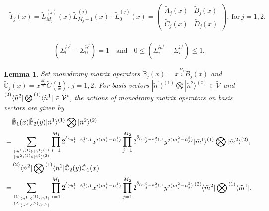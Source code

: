 \documentclass[10pt,a4paper]{amsart}
\newtheorem{lemma}{Lemma}
\begin{document}
	\begin{align}\label{T-j}
		\begin{aligned}
			\tilde{T}_{j}(x) =\tilde{L}_{M_{j}}^{(j)}(x)\tilde{L}_{M_{j}-1}^{(j)}(x)\cdots \tilde{L}_{0}^{(j)}(x)
			=
			\begin{pmatrix}
				\tilde{A}_j(x) & \tilde{B}_j(x) \\
				\tilde{C}_j(x) & \tilde{D}_j(x)
			\end{pmatrix}, \mathrm{~for~} j=1,2.
		\end{aligned}
	\end{align}

	\begin{align}\label{xrxtj}
		(\Sigma_0^{\tilde{m}^j} - \Sigma_0^{\tilde{n}^j}) = 1\quad \text{and} \quad 0 \leq (\Sigma_i^{\tilde{m}^j} - \Sigma_i^{\tilde{n}^j}) \leq 1.
	\end{align}

	\begin{lemma}\label{B-n,C-n,2}
		Set monodromy matrix operators
		$\tilde{\mathbb{B}}_{j}(x) = x^{\frac{M_{j}}{2}} \tilde{B}_{j}(x)$ and $\tilde{\mathbb{C}}_{j}(x) = x^{\frac{M_{j}}{2}} \tilde{C}(\frac{1}{x})$, $j=1,2$.
		For basis vectors
		$| \tilde{n}^{1}\rangle^{(1)}\bigotimes|\tilde{n}^{2}\rangle^{(2)} \in \tilde{\mathcal{V}}$ and
		$\prescript{(2)}{}{\langle \tilde{n}^{2}|}\bigotimes \prescript{(1)}{}{\langle \tilde{n}^{1}|} \in \tilde{\mathcal{V}}^*$,
		the actions of  monodromy matrix operators on basis vectors are given by
		\begin{align}
			 &\tilde{\mathbb{B}}_{1}(x)\tilde{\mathbb{B}}_{2}(y)|\tilde{n}^{1}\rangle^{(1)}\bigotimes|\tilde{n}^{2}\rangle^{(2)} \notag\\
			=&
			\sum_{{ |\tilde{m}^{1} \rangle^{(1)} \triangleright | \tilde{n}^{1} \rangle^{(1)} }\atop{|\tilde{m}^{2} \rangle^{(2)} \triangleright | \tilde{n}^{2} \rangle^{(2)} }}
			\prod_{i=1}^{M_{1}} 2^{\delta_{(\tilde{m}^{1}_i - \tilde{n}^{1}_i), 1}}
			x^{i(\tilde{m}^{1}_i - \tilde{n}^{1}_i)}
			\prod_{j=1}^{M_{2}} 2^{\delta_{(\tilde{m}^{2}_j - \tilde{n}^{2}_j), 1}}
			y^{j(\tilde{m}^{2}_j - \tilde{n}^{2}_j)}
			| \tilde{m}^{1}\rangle^{(1)}\bigotimes|\tilde{m}^{2}\rangle^{(2)}, \label{1-B-n,C-n,2}  \\
			&\prescript{(2)}{}{\langle \tilde{n}^{2}|}\bigotimes \prescript{(1)}{}{\langle \tilde{n}^{1}|}
			\tilde{\mathbb{C}}_{2}(y)\tilde{\mathbb{C}}_{1}(x)\notag\\
			=&
			\sum_{{ \prescript{(1)}{}{\langle \tilde{n}^{1}|}
					\triangleleft
					\prescript{(1)}{}{\langle \tilde{m}^{1}|} }
				\atop{\prescript{(2)}{}{\langle \tilde{n}^{2}|}
					\triangleleft
					\prescript{(2)}{}{\langle \tilde{m}^{2}|}  }}
			\prod_{i=1}^{M_{1}} 2^{\delta_{(\tilde{m}^{1}_i - \tilde{n}^{1}_i), 1}}
			x^{i(\tilde{m}^{1}_i - \tilde{n}^{1}_i)}
			\prod_{j=1}^{M_{2}} 2^{\delta_{(\tilde{m}^{2}_j - \tilde{n}^{2}_j), 1}}
			y^{j(\tilde{m}^{2}_j - \tilde{n}^{2}_j)}
			\prescript{(2)}{}{\langle \tilde{m}^{2}|}\bigotimes \prescript{(1)}{}{\langle \tilde{m}^{1}|} .\label{2-B-n,C-n,2}
		\end{align}
	\end{lemma}
\end{document}
